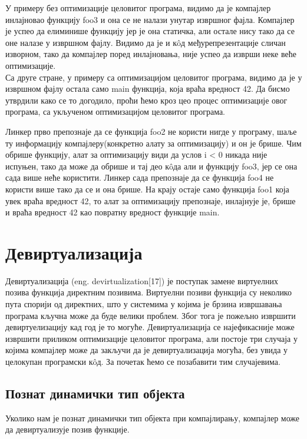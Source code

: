 \documentclass[12pt,oneside]{memoir}
\begin{document}
У примеру без оптимизације целовитог програма, видимо да је компајлер инлајновао
функцију foo3 и она се не налази унутар извршног фајла.
Компајлер је успео да елиминише функцију јер је она статичка, али остале нису
тако да се оне налазе у извршном фајлу.
Видимо да је и к\^{o}д међурепрезентације сличан изворном, тако да компајлер поред
инлајновања, није успео да изврши неке веће оптимизације.
\\
Са друге стране, у примеру са оптимизацијом целовитог програма, видимо да је у
извршном фајлу остала само main функција, која враћа вредност 42.
Да бисмо утврдили како се то догодило, проћи ћемо кроз цео процес оптимизације овог 
програма, са укљученом оптимизацијом целовитог програма.
\par
Линкер прво препознаје да се функција foo2 не користи нигде у програму, шаље ту
информацију компајлеру(конкретно алату за оптимизацију) и он је брише.
Чим обрише функцију, алат за оптимизацију види да услов i < 0 никада није испуњен,
тако да може да обрише и тај део к\^{o}да али и функцију foo3, јер се она сада
више неће користити.
Линкер сада препознаје да се функција foo4 не користи више тако да се и она брише.
На крају остаје само функција foo1 која увек враћа вредност 42, то алат за оптимизацију
препознаје, инлајнује је, брише и враћа вредност 42 као повратну вредност функције
main.

\section{Девиртуализација}
 Девиртуализација (eng. devirtualization[17]) је поступак замене виртуелних позива
 функција директним позивима.
 Виртуелни позиви функција су неколико пута спорији од директних, што у системима
 у којима је брзина извршавања програма кључна може да буде велики проблем.
 Због тога је пожељно извршити девиртуелизацију кад год је то могуће.
 Девиртуализација се најефикасније може извршити приликом оптимизације целовитог
 програма, али постоје три случаја у којима компајлер може да закључи  да је 
 девиртуализација могућа, без увида у целокупан програмски к\^{o}д.
 За почетак ћемо се позабавити тим случајевима.
 
 \subsection{Познат динамички тип објекта}
 Уколико нам је познат динамички тип објекта при компајлирању, компајлер може 
 да девиртуализује позив функције.
 
\end{document}
